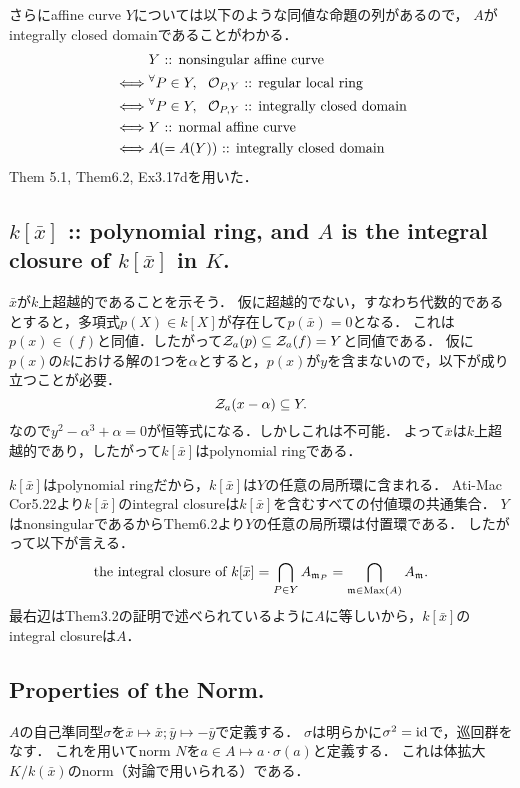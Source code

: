 \documentclass[a4paper]{jsarticle}
\begin{document}
    さらにaffine curve $Y$については以下のような同値な命題の列があるので，
    $A$がintegrally closed domainであることがわかる．
    \begin{align*}
        {}&     Y \text{ :: nonsingular affine curve} \\
        \iff&   {}^{\forall} P \in Y,~~ \mathcal{O}_{P,Y} \text{ :: regular local ring} \\
        \iff&   {}^{\forall} P \in Y,~~ \mathcal{O}_{P,Y} \text{ :: integrally closed domain} \\
        \iff&   Y \text{ :: normal affine curve} \\
        \iff&   A (=A(Y)) \text{ :: integrally closed domain}
    \end{align*}
    Them 5.1, Them6.2, Ex3.17dを用いた．
    
    \subsection{$k[\bar{x}]$ :: polynomial ring, and $A$ is the integral closure of $k[\bar{x}]$ in $K$.}
    $\bar{x}$が$k$上超越的であることを示そう．
    仮に超越的でない，すなわち代数的であるとすると，多項式$p(X) \in k[X]$が存在して$p(\bar{x})=0$となる．
    これは$p(x) \in (f)$と同値．したがって$\mathcal{Z}_a(p) \subseteq \mathcal{Z}_a(f)=Y$と同値である．
    仮に$p(x)$の$k$における解の1つを$\alpha$とすると，$p(x)$が$y$を含まないので，以下が成り立つことが必要．
    \[ \mathcal{Z}_a(x-\alpha) \subseteq Y. \]
    なので$y^2-\alpha^3+\alpha=0$が恒等式になる．しかしこれは不可能．
    よって$\bar{x}$は$k$上超越的であり，したがって$k[\bar{x}]$はpolynomial ringである．

    $k[\bar{x}]$はpolynomial ringだから，$k[\bar{x}]$は$Y$の任意の局所環に含まれる．
    Ati-Mac Cor5.22より$k[\bar{x}]$のintegral closureは$k[\bar{x}]$を含むすべての付値環の共通集合．
    $Y$はnonsingularであるからThem6.2より$Y$の任意の局所環は付置環である．
    したがって以下が言える．
    \[ \text{the integral closure of }k[\bar{x}] = \bigcap_{P \in Y} A_{\mathfrak{m}_P}=\bigcap_{\mathfrak{m} \in \operatorname{Max}(A)} A_{\mathfrak{m}}. \]
    最右辺はThem3.2の証明で述べられているように$A$に等しいから，$k[\bar{x}]$のintegral closureは$A$．

    \subsection{Properties of the Norm.}
    $A$の自己準同型$\sigma$を$\bar{x} \mapsto \bar{x}; \bar{y} \mapsto -\bar{y}$で定義する．
    $\sigma$は明らかに$\sigma^2=\mathrm{id}_{}$で，巡回群をなす．
    これを用いてnorm $N$を$a \in A \mapsto a \cdot \sigma(a)$と定義する．
    これは体拡大$K/k(\bar{x})$のnorm（対論で用いられる）である．
\end{document}

